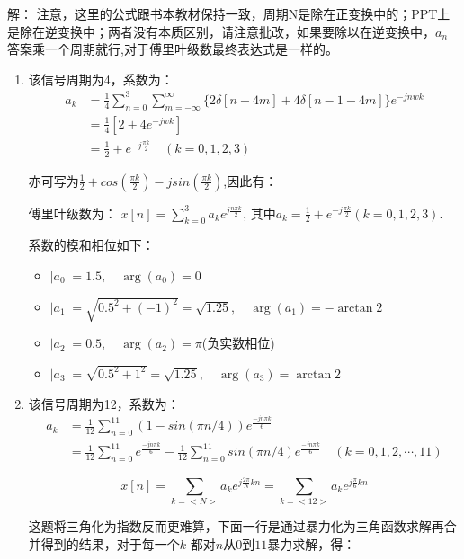 \documentclass[a4paper,UTF8]{article}
\numberwithin{equation}{section}
\begin{document}
\begin{framed}
    解：{\color{red} 注意，这里的公式跟书本教材保持一致，周期N是除在正变换中的；PPT上是除在逆变换中；两者没有本质区别，请注意批改，如果要除以在逆变换中，$a_n$答案乘一个周期就行,对于傅里叶级数最终表达式是一样的。}
    \begin{enumerate}[(1)]
    	\item 该信号周期为4，系数为：
    	\begin{align*}
    		a_k &= \frac{1}{4}\sum\limits_{n = 0}^{3}\sum\limits_{m=-\infty}^{\infty}\{2\delta{[n-4m]}+4\delta{[n-1-4m]}\}e^{-jnwk}\\
    		&= \frac{1}{4}[2+4e^{-jwk}]\\
    		&= \frac{1}{2} + e^{-j\frac{\pi k}{2}}\quad(k = 0,1,2,3)
    	\end{align*}
    	
    	亦可写为$\frac{1}{2} + cos(\frac{\pi k}{2})-jsin(\frac{\pi k}{2})$,因此有：
    	
    	傅里叶级数为：
    	$x[n] = \sum\limits_{k=0}^{3}a_ke^{j\frac{n\pi k}{2}}$, 其中$a_k = \frac{1}{2} + e^{-j\frac{\pi k}{2}}(k = 0,1,2,3)$.
    	
    	系数的模和相位如下：
    	\begin{itemize}
    		\item \( |a_0| = 1.5, \quad \arg(a_0) = 0 \)
    		\item \( |a_1| = \sqrt{0.5^2 + (-1)^2} = \sqrt{1.25} , \quad \arg(a_1) = -\arctan2 \)
    		\item \( |a_2| = 0.5, \quad \arg(a_2) = \pi \)(负实数相位)
    		\item \( |a_3| = \sqrt{0.5^2 + 1^2} = \sqrt{1.25}, \quad \arg(a_3) = \arctan2 \)
    	\end{itemize}
    	
    	\item  该信号周期为12，系数为：
    	\begin{align*}
    		a_k &= \frac{1}{12}\sum\limits_{n = 0}^{11}(1-sin(\pi n/4))e^{\frac{-jn\pi k}{6}}\\
    		& = \frac{1}{12}\sum\limits_{n = 0}^{11}e^{\frac{-jn\pi k}{6}} - \frac{1}{12}\sum\limits_{n = 0}^{11}sin(\pi n/4)e^{\frac{-jn\pi k}{6}}\quad(k = 0,1,2,\cdots,11)
    	\end{align*}
    
    	\[ x[n] = \sum_{k=<N>} a_k e^{j \frac{2\pi}{N} kn} = \sum_{k=<12>} a_k e^{j \frac{\pi}{6} kn} \]
    	
    	这题将三角化为指数反而更难算，下面一行是通过暴力化为三角函数求解再合并得到的结果，对于每一个$k$ 都对$n$从$0$到$11$暴力求解，得：
    	

\end{enumerate}
\end{framed}
\end{document}
